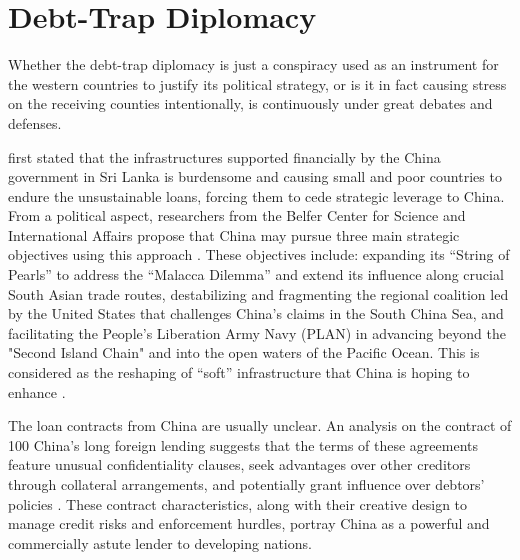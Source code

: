 \section*{Debt-Trap Diplomacy}
Whether the debt-trap diplomacy is just a conspiracy used as an instrument for the western countries to justify its political strategy, or is it in fact causing stress on the receiving counties intentionally, is continuously under great debates and defenses.

\citet{Chellaney_2017} first stated that the infrastructures supported financially by the China government in Sri Lanka is burdensome and causing small and poor countries to endure the unsustainable loans, forcing them to cede strategic leverage to China.
From a political aspect,
researchers from the Belfer Center for Science and International Affairs propose that China may pursue three main strategic objectives using this approach \citep*{Parker2018}.
These objectives include: expanding its ``String of Pearls'' to address the ``Malacca Dilemma\footnotemark{}'' and extend its influence along crucial South Asian trade routes, destabilizing and fragmenting the regional coalition led by the United States that challenges China's claims in the South China Sea, and facilitating the People's Liberation Army Navy (PLAN) in advancing beyond the "Second Island Chain" and into the open waters of the Pacific Ocean.
This is considered as the reshaping of ``soft'' infrastructure that China is hoping to enhance \citep{Jonathan-Hillman-18}.

The loan contracts from China are usually unclear.
An analysis on the contract of 100 China's long foreign lending suggests that the terms of these agreements feature unusual confidentiality clauses, seek advantages over other creditors through collateral arrangements, and potentially grant influence over debtors' policies \citep{Gelpern-22}. These contract characteristics, along with their creative design to manage credit risks and enforcement hurdles, portray China as a powerful and commercially astute lender to developing nations.


